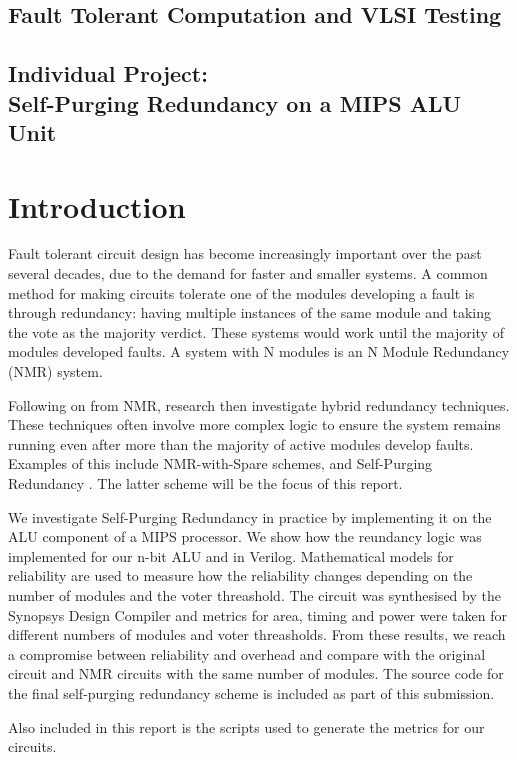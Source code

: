 \documentclass[a4paper,12pt]{article}
\begin{document}
    \begin{center}
        \section*{Fault Tolerant Computation and VLSI Testing}
        \subsection*{Individual Project:\\Self-Purging Redundancy on a MIPS ALU Unit}
    \end{center}

    \section{Introduction}
    Fault tolerant circuit design has become increasingly important over the past several decades, due to the demand for faster and smaller systems. A common method for making circuits tolerate one of the modules developing a fault is through redundancy: having multiple instances of the same module and taking the vote as the majority verdict. These systems would work until the majority of modules developed faults. A system with N modules is an N Module Redundancy (NMR) system.

    Following on from NMR, research then investigate hybrid redundancy techniques. These techniques often involve more complex logic to ensure the system remains running even after more than the majority of active modules develop faults. Examples of this include NMR-with-Spare schemes, and Self-Purging Redundancy \cite{1674656}. The latter scheme will be the focus of this report.

    We investigate Self-Purging Redundancy in practice by implementing it on the ALU component of a MIPS processor. We show how the reundancy logic was implemented for our n-bit ALU and in Verilog. Mathematical models for reliability are used to measure how the reliability changes depending on the number of modules and the voter threashold. The circuit was synthesised by the Synopsys Design Compiler and metrics for area, timing and power were taken for different numbers of modules and voter threasholds. From these results, we reach a compromise between reliability and overhead and compare with the original circuit and NMR circuits with the same number of modules. The source code for the final self-purging redundancy scheme is included as part of this submission.

    Also included in this report is the scripts used to generate the metrics for our circuits.

    \printbibliography
\end{document}
